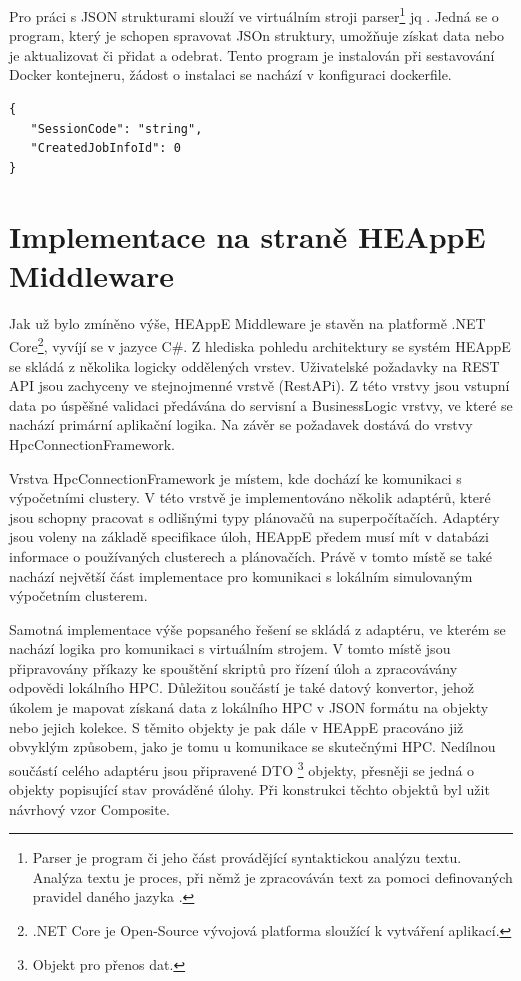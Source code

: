 Pro práci s JSON strukturami slouží ve virtuálním stroji parser\footnote{Parser je program či jeho část provádějící syntaktickou analýzu textu. Analýza textu je proces, při němž je zpracováván text za pomoci definovaných pravidel daného jazyka \cite{uEN4MdNhBpkZmkHF}.} jq \cite{qibOqajDMnKYNjXq}. Jedná se o program, který je schopen spravovat JSOn struktury, umožňuje získat data nebo je aktualizovat či přidat a odebrat. Tento program je instalován při sestavování Docker kontejneru, žádost o instalaci se nachází v konfiguraci dockerfile.

\hfill \break
\begin{lstlisting}[caption={Příklad JSON struktury}]
{
   "SessionCode": "string",
   "CreatedJobInfoId": 0
}
\end{lstlisting}

\section{Implementace na straně HEAppE Middleware}
Jak už bylo zmíněno výše, HEAppE Middleware je stavěn na platformě .NET Core\footnote{.NET Core je Open-Source vývojová platforma sloužící k vytváření aplikací.}, vyvíjí se v jazyce C\#. Z hlediska pohledu architektury se systém HEAppE se skládá z několika logicky oddělených vrstev. Uživatelské požadavky na REST API jsou zachyceny ve stejnojmenné vrstvě (RestAPi). Z této vrstvy jsou vstupní data po úspěšné validaci předávána do servisní a BusinessLogic vrstvy, ve které se nachází primární aplikační logika. Na závěr se požadavek dostává do vrstvy HpcConnectionFramework.

Vrstva HpcConnectionFramework je místem, kde dochází ke komunikaci s výpočetními clustery. V této vrstvě je implementováno několik adaptérů, které jsou schopny pracovat s odlišnými typy plánovačů na superpočítačích. Adaptéry jsou voleny na základě specifikace úloh, HEAppE předem musí mít v databázi informace o používaných clusterech a plánovačích. Právě v tomto místě se také nachází největší část implementace pro komunikaci s lokálním simulovaným výpočetním clusterem.

Samotná implementace výše popsaného řešení se skládá z adaptéru, ve kterém se nachází logika pro komunikaci s virtuálním strojem. V tomto místě jsou připravovány příkazy ke spouštění skriptů pro řízení úloh a zpracovávány odpovědi lokálního HPC. Důležitou součástí je také datový konvertor, jehož úkolem je mapovat získaná data z lokálního HPC v JSON formátu na objekty nebo jejich kolekce. S těmito objekty je pak dále v HEAppE pracováno již obvyklým způsobem, jako je tomu u komunikace se skutečnými HPC. Nedílnou součástí celého adaptéru jsou připravené DTO \footnote{Objekt pro přenos dat.} objekty, přesněji se jedná o objekty popisující stav prováděné úlohy. Při konstrukci těchto objektů byl užit návrhový vzor Composite.

